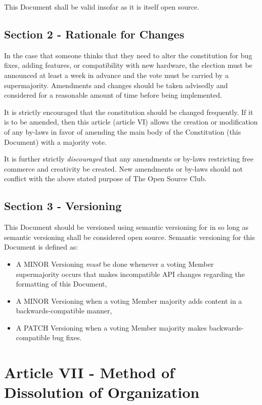 \documentclass{article}
\begin{document}
  This Document shall be valid insofar as it is itself open source.

  \subsection{Section 2 - Rationale for Changes}

	In the case that someone thinks that they need to alter the constitution for bug fixes, adding features, or compatibility with new hardware, the election must be announced at least a week in advance and the vote must be carried by a supermajority. Amendments and changes should be taken advisedly and considered for a reasonable amount of time before being implemented.

	It is strictly encouraged that the constitution should be changed frequently. If it is to be amended, then this article (article VI) allows the creation or modification of any by-laws in favor of amending the main body of the Constitution (this Document) with a majority vote.

	It is further strictly \textit{discouraged} that any amendments or by-laws restricting free commerce and creativity be created. New amendments or by-laws should not conflict with the above stated purpose of The Open Source Club.

  \subsection{Section 3 - Versioning}

  This Document should be versioned using semantic versioning for in so long as semantic versioning shall be considered open source. Semantic versioning for this Document is defined as:

  \begin{itemize}
    \item A MINOR Versioning \textit{must} be done whenever a voting Member supermajority occurs that makes incompatible API changes regarding the formatting of this Document,
    \item A MINOR Versioning when a voting Member majority adds content in a backwards-compatible manner,
    \item A PATCH Versioning when a voting Member majority makes backwards-compatible bug fixes.
  \end{itemize}

	\section{Article VII - Method of Dissolution of Organization}
\end{document}

